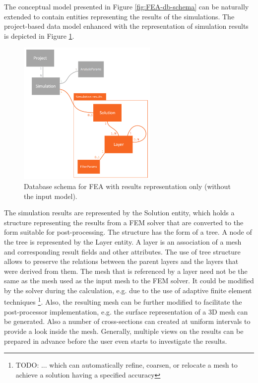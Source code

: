 
The conceptual model presented in Figure \ref{fig:FEA-db-schema} can be naturally extended to contain entities representing the results of the simulations. The project-based data model enhanced with the representation of simulation results is depicted in Figure \ref{fig:FEA-db-schema-results}.

\begin{figure}[H]
    \centering
    \includegraphics[width=0.6\textwidth]{figures/chapter-data-management/FEA-database-schema-only-results}
    \decoRule
    \caption{Database schema for FEA with results representation only (without the input model).}
    \label{fig:FEA-db-schema-results}
\end{figure}

The simulation results are represented by the Solution entity, which holds a structure representing the results from a FEM solver that are converted to the form suitable for post-processing. The structure has the form of a tree. A node of the tree is represented by the Layer entity. A layer is an association of a mesh and corresponding result fields and other attributes. The use of tree structure allows to preserve the relations between the parent layers and the layers that were derived from them. The mesh that is referenced by a layer need not be the same as the mesh used as the input mesh to the FEM solver. It could be modified by the solver during the calculation, e.g. due to the use of adaptive finite element techniques \footnote{TODO: ... which can automatically refine, coarsen, or relocate a mesh to achieve a solution having a specified accuracy}. Also, the resulting mesh can be further modified to facilitate the post-processor implementation, e.g. the surface representation of a 3D mesh can be generated. Also a number of cross-sections can created at uniform intervals to provide a look inside the mesh. Generally, multiple views on the results can be prepared in advance before the user even starts to investigate the results.

